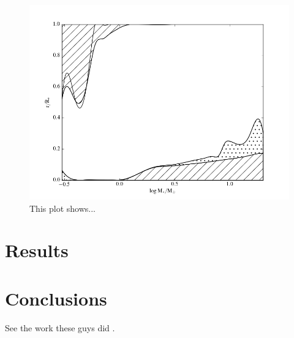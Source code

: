 \documentclass[12pt]{article}
\begin{document}
\begin{figure}%
  \centering
  \includegraphics[width=7.0in]{money2.png}
  \caption{This plot shows...}
  \label{money2}
\end{figure}




\section{Results}


\section{Conclusions}
See the work these guys did \cite{Alongi}.

\newpage


\end{document}
